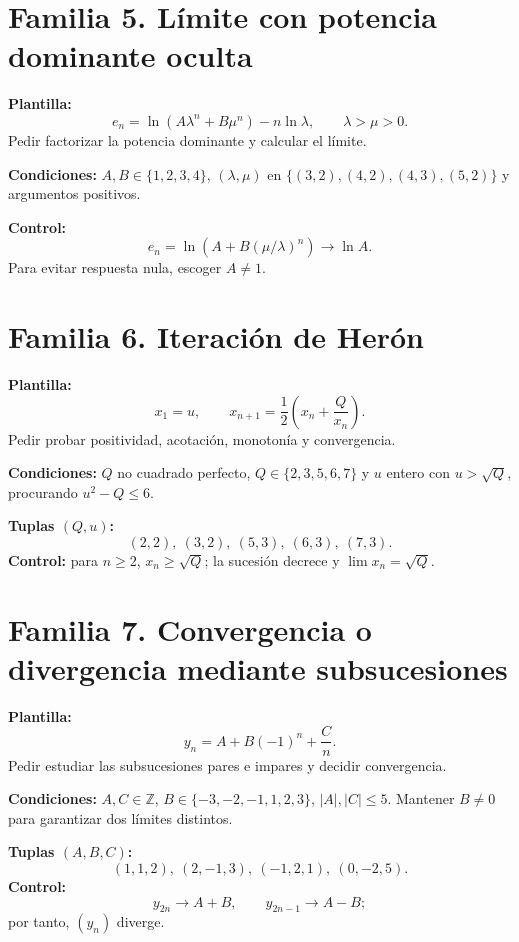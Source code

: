 \documentclass[12pt,letterpaper]{article}
\newcommand{\familia}[2]{\section*{Familia #1. #2}}
\newcommand{\campo}[1]{\textcolor{azul}{\textbf{#1}}}
\begin{document}
\familia{5}{Límite con potencia dominante oculta}
\campo{Plantilla:}
\[
 e_n=\ln\!\left(A\lambda^n+B\mu^n\right)-n\ln\lambda,
\qquad \lambda>\mu>0.
\]
Pedir factorizar la potencia dominante y calcular el límite.\par
\campo{Condiciones:} $A,B\in\{1,2,3,4\}$, $(\lambda,\mu)$ en
$\{(3,2),(4,2),(4,3),(5,2)\}$ y argumentos positivos.\par
\campo{Control:}
\[
 e_n=\ln\!\left(A+B(\mu/\lambda)^n\right)
\longrightarrow\ln A.
\]
Para evitar respuesta nula, escoger $A\neq1$.

\familia{6}{Iteración de Herón}
\campo{Plantilla:}
\[
 x_1=u,\qquad
 x_{n+1}=\frac12\left(x_n+\frac{Q}{x_n}\right).
\]
Pedir probar positividad, acotación, monotonía y convergencia.\par
\campo{Condiciones:} $Q$ no cuadrado perfecto, $Q\in\{2,3,5,6,7\}$ y
$u$ entero con $u>\sqrt Q$, procurando $u^2-Q\leq6$.\par
\campo{Tuplas $(Q,u)$:}
\[
 (2,2),\ (3,2),\ (5,3),\ (6,3),\ (7,3).
\]
\campo{Control:} para $n\geq2$, $x_n\geq\sqrt Q$; la sucesión decrece y
$\lim x_n=\sqrt Q$.

\familia{7}{Convergencia o divergencia mediante subsucesiones}
\campo{Plantilla:}
\[
 y_n=A+B(-1)^n+\frac{C}{n}.
\]
Pedir estudiar las subsucesiones pares e impares y decidir convergencia.\par
\campo{Condiciones:} $A,C\in\mathbb Z$, $B\in\{-3,-2,-1,1,2,3\}$,
$|A|,|C|\leq5$. Mantener $B\neq0$ para garantizar dos límites distintos.\par
\campo{Tuplas $(A,B,C)$:}
\[
 (1,1,2),\ (2,-1,3),\ (-1,2,1),\ (0,-2,5).
\]
\campo{Control:}
\[
 y_{2n}\longrightarrow A+B,
\qquad
 y_{2n-1}\longrightarrow A-B;
\]
por tanto, $(y_n)$ diverge.
\end{document}
